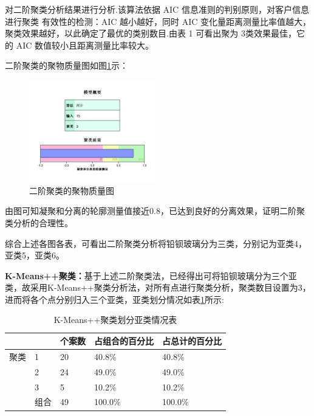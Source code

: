 \documentclass{my_paper}
\begin{document}
对二阶聚类分析结果进行分析.该算法依据 AIC 信息准则的判别原则，对客户信息进行聚类
有效性的检测：AIC 越小越好，同时 AIC 变化量距离测量比率值越大，聚类效果越好，以此确定了最优的类别数目.由表 1 可看出聚为 3类效果最佳，它的 AIC 数值较小且距离测量比率较大。\par
二阶聚类的聚物质量图如图\ref{聚物质量图}示：
\begin{figure}[H]
    \centering
    \includegraphics[width=0.49\textwidth]{聚类质量.jpg}
    \caption{二阶聚类的聚物质量图}
    \label{聚物质量图}
\end{figure}

由图可知凝聚和分离的轮廓测量值接近0.8，已达到良好的分离效果，证明二阶聚类分析的合理性。\par
综合上述各图各表，可看出二阶聚类分析将铅钡玻璃分为三类，分别记为亚类4，亚类5，亚类6。\par
\textbf{K-Means++聚类：}基于上述二阶聚类法，已经得出可将铅钡玻璃分为三个亚类，故采用K-Means++聚类分析法，对所有点进行聚类分析，聚类数目设置为3，进而将各个点分别归入三个亚类，亚类划分情况如表\ref{K-Means++聚类划分亚类情况表}所示:
\begin{table}[H]
    \centering
    \caption{K-Means++聚类划分亚类情况表}
    \label{K-Means++聚类划分亚类情况表}
    \begin{tabular}{lllll}
    \hline
        ~ & ~ & 个案数 & 占组合的百分比 & 占总计的百分比 \\ \hline
        聚类 & 1 & 20 & 40.8\% & 40.8\% \\ 
        ~ & 2 & 24 & 49.0\% & 49.0\% \\ 
        ~ & 3 & 5 & 10.2\% & 10.2\% \\ 
        ~ & 组合 & 49 & 100.0\% & 100.0\% \\ \hline
    \end{tabular}
\end{table}
\end{document}
